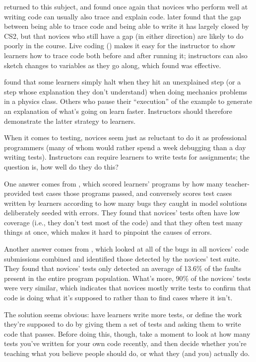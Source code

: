 \cite{List2009} returned to this subject, and found once again that
novices who perform well at writing code can usually also trace and
explain code.  \cite{Harr2018} later found that the gap between being
able to trace code and being able to write it has largely closed by
CS2, but that novices who still have a gap (in either direction) are
likely to do poorly in the course.  Live coding
() makes it easy for the instructor to show
learners how to trace code both before and after running it;
instructors can also sketch changes to variables as they go along,
which \cite{Cunn2017} found was effective.

\cite{Chi1989} found that some learners simply halt when they hit an
unexplained step (or a step whose explanation they don't understand)
when doing mechanics problems in a physics class.  Others who pause
their ``execution'' of the example to generate an explanation of
what's going on learn faster.  Instructors should therefore
demonstrate the latter strategy to learners.

When it comes to testing, novices seem just as reluctant to do it as
professional programmers (many of whom would rather spend a week
debugging than a day writing tests).  Instructors can require learners
to write tests for assignments; the question is, how well do they do
this?

One answer comes from \cite{Bria2015}, which scored learners' programs
by how many teacher-provided test cases those programs passed, and
conversely scores test cases written by learners according to how many
bugs they caught in model solutions deliberately seeded with errors.
They found that novices' tests often have low coverage (i.e., they
don't test most of the code) and that they often test many things at
once, which makes it hard to pinpoint the causes of errors.

Another answer comes from \cite{Edwa2014b}, which looked at all of the
bugs in all novices' code submissions combined and identified those
detected by the novices' test suite.  They found that novices' tests
only detected an average of 13.6\% of the faults present in the entire
program population.  What's more, 90\% of the novices' tests were very
similar, which indicates that novices mostly write tests to confirm
that code is doing what it's supposed to rather than to find cases
where it isn't.

The solution seems obvious: have learners write more tests, or define
the work they're supposed to do by giving them a set of tests and
asking them to write code that passes.  Before doing this, though,
take a moment to look at how many tests you've written for your own
code recently, and then decide whether you're teaching what you
believe people should do, or what they (and you) actually do.

